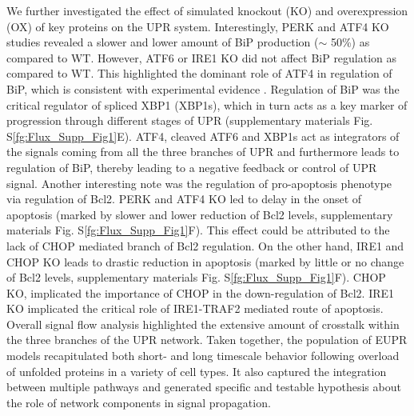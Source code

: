 \documentclass[fleqn,10pt]{wlscirep}
\begin{document}
We further investigated the effect of simulated knockout (KO) and overexpression (OX) of key proteins on the UPR system. Interestingly, PERK and ATF4 KO studies revealed a slower and lower amount of BiP production ($\sim$ 50\%) as compared to WT. However, ATF6 or IRE1 KO did not affect BiP regulation as compared to WT. This highlighted the dominant role of ATF4 in regulation of BiP, which is consistent with experimental evidence \cite{ma2003delineation}. Regulation of BiP was the critical regulator of spliced XBP1 (XBP1s), which in turn acts as a key marker of progression through different stages of UPR (supplementary materials Fig. S\ref{fg:Flux_Supp_Fig1}E). ATF4, cleaved ATF6 and XBP1s act as integrators of the signals coming from all the three branches of UPR and furthermore leads to regulation of BiP, thereby leading to a negative feedback or control of UPR signal. Another interesting note was the regulation of pro-apoptosis phenotype via regulation of Bcl2. PERK and ATF4 KO led to delay in the onset of apoptosis (marked by slower and lower reduction of Bcl2 levels, supplementary materials Fig. S\ref{fg:Flux_Supp_Fig1}F). This effect could be attributed to the lack of CHOP mediated branch of Bcl2 regulation. On the other hand, IRE1 and CHOP KO leads to drastic reduction in apoptosis (marked by little or no change of Bcl2 levels, supplementary materials Fig. S\ref{fg:Flux_Supp_Fig1}F). CHOP KO, implicated the importance of CHOP in the down-regulation of Bcl2. IRE1 KO implicated the critical role of IRE1-TRAF2 mediated route of apoptosis. Overall signal flow analysis highlighted the extensive amount of crosstalk within the three branches of the UPR network. Taken together, the population of EUPR models recapitulated both short- and long timescale behavior following overload of unfolded proteins in a variety of cell types. It also captured the integration between multiple pathways and generated specific and testable hypothesis about the role of network components in signal propagation.    
\end{document}
